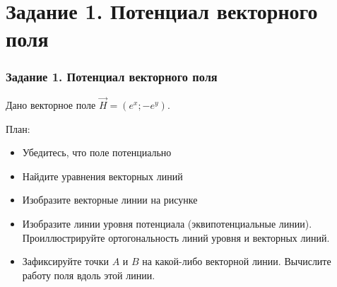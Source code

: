 \section{Задание 1. Потенциал векторного поля}
\begin{frame}\frametitle{Задание 1. Потенциал векторного поля}
Дано векторное поле $\vec H = \left( e^x; -e^y \right)$.

План:
\begin{itemize}
  \item Убедитесь, что поле потенциально
  \item Найдите уравнения векторных линий
  \item Изобразите векторные линии на рисунке
  \item Изобразите линии уровня потенциала (эквипотенциальные линии).
  Проиллюстрируйте ортогональность линий уровня и векторных линий.
  \item Зафиксируйте точки $A$ и $B$ на какой-либо векторной линии.
  Вычислите работу поля вдоль этой линии.
\end{itemize}
\end{frame}


